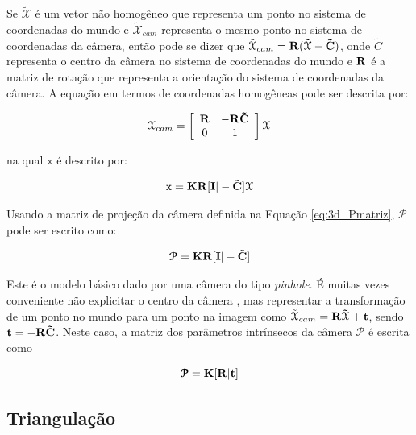 {Se $\tilde{\mathcal{X}}$ é um vetor não homogêneo que representa um ponto no sistema de coordenadas do mundo e $\tilde{\mathcal{X}}_{cam}$ representa o mesmo ponto no sistema de coordenadas da câmera, então pode se dizer que $\tilde{\mathcal{X}}_{cam} = \bf{R}(\tilde{\mathcal{X}} - \tilde{C})$, onde $\tilde{C}$ representa o centro da câmera no sistema de coordenadas do mundo e $\bf{R}$ é a matriz de rotação que representa a orientação do sistema de coordenadas da câmera. A equação em termos de coordenadas homogêneas pode ser descrita por:

\begin{align}
\mathcal{X}_{cam} =
\left[\begin{array}{cc}
\bf{R} &  -\bf{R}\tilde{C}\\
0 & 1
\end{array}\right]
\mathcal{X}
\label{eq:3d_matRot}
\end{align}

na qual $\mathtt{x}$ é descrito por:

\begin{equation}
\mathtt{x} = \bf{K}\bf{R}[\bf{I}|-\tilde{C}]\mathcal{X}
\label{eq:3d_camModel2}
\end{equation}

Usando a matriz de projeção da câmera definida na Equação \ref{eq:3d_Pmatriz},  $\bm{\mathcal{P}}$ pode ser escrito como:

\begin{equation}
\bm{\mathcal{P}} = \bf{K}\bf{R}[\bf{I}|-\tilde{C}]
\label{eq:3d_PModel1}
\end{equation}


Este é o modelo básico dado por uma câmera do tipo \textit{pinhole}. É muitas vezes conveniente não explicitar o centro da câmera \cite{hartley2003multiple}, mas representar a transformação de um ponto no mundo para um ponto na imagem como $\tilde{\mathcal{X}}_{cam} = \bf{R}\tilde{\mathcal{X}} + \bf{t}$, sendo $\bf{t} =-\bf{R}\tilde{C}$. Neste caso, a matriz dos parâmetros intrínsecos da câmera $\bm{\mathcal{P}}$  é escrita como

\begin{equation}
\bm{\mathcal{P}} = \bf{K}[\bf{R}|\bf{t}]
\label{eq:3d_PModel2}
\end{equation}

\subsection{Triangulação}

}
